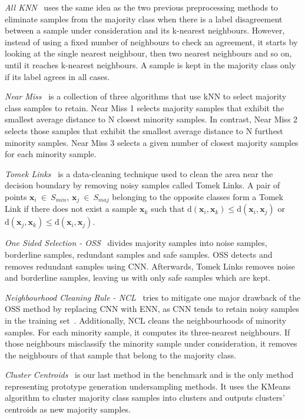 \documentclass[conference]{IEEEtran}
\begin{document}
\emph{All KNN}~\cite{repeated-enn} uses the same idea as the two previous preprocessing methods to
eliminate samples from the majority class when there is a label disagreement between a sample under
consideration and its k-nearest neighbours. However, instead of using a fixed number of neighbours
to check an agreement, it starts by looking at the single nearest neighbour, then two nearest
neighbours and so on, until it reaches k-nearest neighbours. A sample is kept in the majority class
only if its label agrees in all cases.

\emph{Near Miss}~\cite{near-miss} is a collection of three algorithms that use kNN to select
majority class samples to retain. Near Miss 1 selects majority samples that exhibit the smallest
average distance to $\mathrm{N}$ closest minority samples. In contrast, Near Miss 2 selects those
samples that exhibit the smallest average distance to $\mathrm{N}$ furthest minority samples. Near
Miss 3 selects a given number of closest majority samples for each minority sample.

\emph{Tomek Links}~\cite{tomek-links} is a data-cleaning technique used to clean the area near the
decision boundary by removing noisy samples called Tomek Links. A pair of points
$\mathbf{x}_i~\in~S_{min}$, $\mathbf{x}_j~\in~S_{maj}$ belonging to the opposite classes form a
Tomek Link if there does not exist a sample $\mathbf{x}_k$ such that $\mathrm{d}(\mathbf{x}_i,
\mathbf{x}_k) \leq \mathrm{d}(\mathbf{x}_i, \mathbf{x}_j)$ or $\mathrm{d}(\mathbf{x}_j,
\mathbf{x}_k) \leq \mathrm{d}(\mathbf{x}_i, \mathbf{x}_j)$.

\emph{One Sided Selection - OSS}~\cite{one-sided-selection} divides majority samples into noise
samples, borderline samples, redundant samples and safe samples. OSS detects and removes redundant
samples using CNN. Afterwards, Tomek Links removes noise and borderline samples, leaving us with
only safe samples which are kept.

\emph{Neighbourhood Cleaning Rule - NCL}~\cite{ncl} tries to mitigate one major drawback of the OSS
method by replacing CNN with ENN, as CNN tends to retain noisy samples in the training
set~\cite{ncl}. Additionally, NCL cleans the neighbourhoods of minority samples. For each minority
sample, it computes its three-nearest neighbours. If those neighbours misclassify the minority
sample under consideration, it removes the neighbours of that sample that belong to the majority
class.

\emph{Cluster Centroids}~\cite{cluster-centroids} is our last method in the benchmark and is the
only method representing prototype generation undersampling methods. It uses the KMeans algorithm
to cluster majority class samples into clusters and outputs clusters' centroids as new majority
samples.
\end{document}
